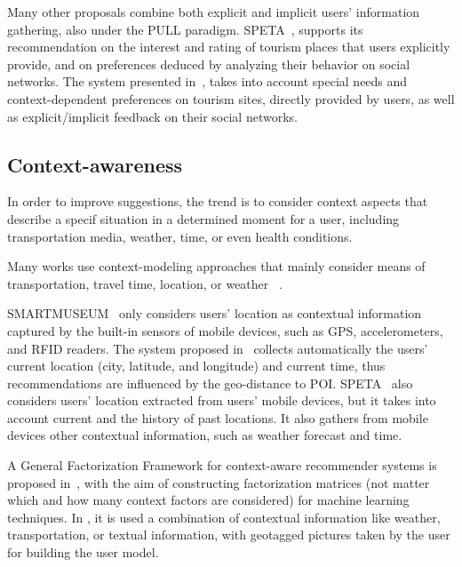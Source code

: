 Many other proposals combine both explicit and implicit users' information gathering, also under the PULL paradigm. SPETA~\cite{garcia2009speta},  supports  its recommendation on the interest and rating  of tourism places that users explicitly provide, and on preferences deduced by analyzing their behavior on social networks. The system presented in~\cite{alonso2012ontology}, takes into account special needs and  context-dependent preferences on tourism sites, directly  provided by users, as well as explicit/implicit feedback on their social networks. 

\subsection{Context-awareness}
In order to improve suggestions, the trend is to consider context aspects that describe a specif situation in a determined moment for a user, including transportation media, weather, time, or even health conditions. 

Many works use context-modeling approaches that mainly consider means of transportation, travel time,  location, or weather~\cite{rajaonarivo2019rec}\cite{bahramian_abbaspour_claramunt_2017}\cite{arigi2018context}\cite{kesorn2017personalized}\cite{logesh2019exploring} \cite{logesh2018personalised}.


SMARTMUSEUM~\cite{ruotsalo2013smartmuseum} only considers users' location as contextual information captured by the built-in sensors of mobile devices, such as GPS, accelerometers, and RFID readers. The system proposed in~\cite{shen2016attraction} collects automatically the users' current location (city, latitude, and longitude) and current time, thus recommendations are influenced by the geo-distance to POI. SPETA~\cite{garcia2009speta} also considers users' location extracted from users' mobile devices, but it takes into account current and the history of past locations. It also gathers from  mobile devices other contextual information, such as weather forecast and time. 


A General Factorization Framework for context-aware recommender systems is proposed in~\cite{hidasi2016general}, with the aim of constructing factorization matrices (not matter which and how many context factors are considered) for machine learning techniques. In \cite{sun2019building}, it is used a combination of contextual information like weather, transportation, or textual information, with geotagged pictures taken by the user for building the user model.


